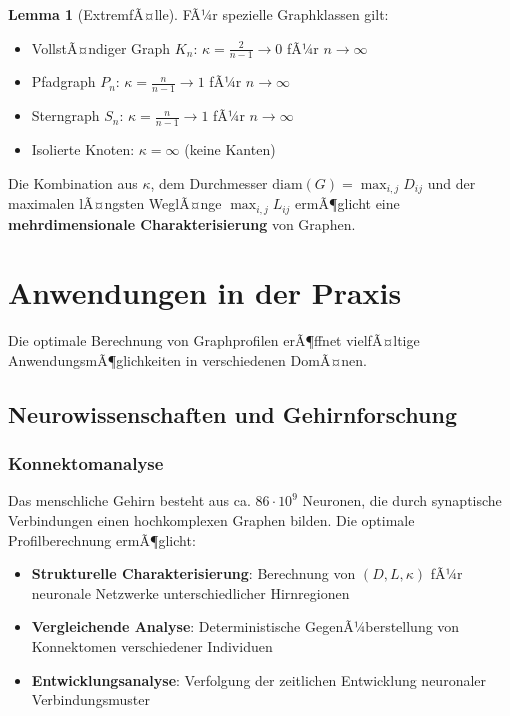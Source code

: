 ﻿\documentclass[a4paper,12pt]{article}
\theoremstyle{definition}
\newtheorem{lemma}{Lemma}
\begin{document}
	\begin{lemma}[ExtremfÃ¤lle]
		FÃ¼r spezielle Graphklassen gilt:
		\begin{itemize}
			\item[-] VollstÃ¤ndiger Graph $K_n$: $\kappa = \frac{2}{n-1} \to 0$ fÃ¼r $n \to \infty$
			\item[-] Pfadgraph $P_n$: $\kappa = \frac{n}{n-1} \to 1$ fÃ¼r $n \to \infty$
			\item[-] Sterngraph $S_n$: $\kappa = \frac{n}{n-1} \to 1$ fÃ¼r $n \to \infty$
			\item[-] Isolierte Knoten: $\kappa = \infty$ (keine Kanten)
		\end{itemize}
	\end{lemma}
	
	Die Kombination aus $\kappa$, dem Durchmesser $\text{diam}(G) = \max_{i,j} D_{ij}$ und der maximalen lÃ¤ngsten WeglÃ¤nge $\max_{i,j} L_{ij}$ ermÃ¶glicht eine \textbf{mehrdimensionale Charakterisierung} von Graphen.
	
	\section{Anwendungen in der Praxis}
	
	Die optimale Berechnung von Graphprofilen erÃ¶ffnet vielfÃ¤ltige AnwendungsmÃ¶glichkeiten in verschiedenen DomÃ¤nen.
	
	\subsection{Neurowissenschaften und Gehirnforschung}
	
	\subsubsection{Konnektomanalyse}
	
	Das menschliche Gehirn besteht aus ca. $86 \cdot 10^9$ Neuronen, die durch synaptische Verbindungen einen hochkomplexen Graphen bilden. Die optimale Profilberechnung ermÃ¶glicht:
	
	\begin{itemize}
		\item[-] \textbf{Strukturelle Charakterisierung}: Berechnung von $(D, L, \kappa)$ fÃ¼r neuronale Netzwerke unterschiedlicher Hirnregionen
		\item[-] \textbf{Vergleichende Analyse}: Deterministische GegenÃ¼berstellung von Konnektomen verschiedener Individuen
		\item[-] \textbf{Entwicklungsanalyse}: Verfolgung der zeitlichen Entwicklung neuronaler Verbindungsmuster
	\end{itemize}
	
\end{document}
